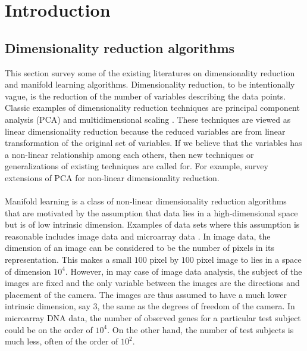 \chapter{Introduction}
\label{cha:introduction}

\section{Dimensionality reduction algorithms}
\label{sec:dimens-reduct-algor}
This section survey some of the existing literatures on dimensionality
reduction and manifold learning algorithms. Dimensionality reduction,
to be intentionally vague, is the reduction of the number of variables
describing the data points. Classic examples of dimensionality
reduction techniques are principal component analysis (PCA)
\citep{pearson01:_on,hotelling33:_analy} and multidimensional scaling
\citep{torgesen52:_multid}. These techniques are viewed as linear
dimensionality reduction because the reduced variables are from linear
transformation of the original set of variables. If we believe that
the variables has a non-linear relationship among each others, then
new techniques or generalizations of existing techniques are called
for. For example, \citet{gorban08:_princ_manif} survey extensions of
PCA for non-linear dimensionality reduction. \\ \\
%
%
Manifold learning is a class of non-linear dimensionality reduction
algorithms that are motivated by the assumption that data lies in a
high-dimensional space but is of low intrinsic dimension. Examples of
data sets where this assumption is reasonable includes image data
\citep{tenebaum00:_global_geomet_framew_nonlin_dimen_reduc} and
microarray data \citep{wouters03:_graph}. In image data, the dimension
of an image can be considered to be the number of pixels in its
representation. This makes a small $100$ pixel by $100$ pixel image to
lies in a space of dimension $10^4$. However, in may case of image
data analysis, the subject of the images are fixed and the only
variable between the images are the directions and placement of the
camera. The images are thus assumed to have a much lower intrinsic
dimension, say $3$, the same as the degrees of freedom of the
camera. In microarray DNA data, the number of observed genes for a
particular test subject could be on the order of $10^4$. On the other
hand, the number of test subjects is much less, often of the order of
$10^2$. \\ \\
